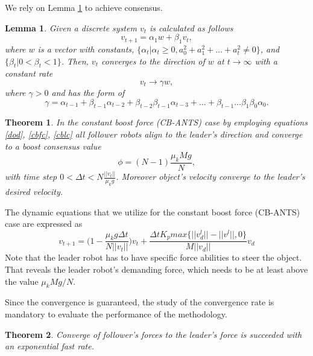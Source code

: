 \documentclass[letterpaper, 10 pt, conference]{ieeeconf}
\newtheorem{lemma}{\textbf{Lemma}}
\newtheorem{theorem}{\textbf{Theorem}}
\begin{document}
We rely on Lemma \ref{lem1} to achieve consensus. \vspace{.2cm}
\begin{lemma}\label{lem1}
\textit{Given a discrete system $v_t$ is calculated as follows
\begin{equation}
v_{t+1}=\alpha_1 w+\beta_1 v_t,
\end{equation}
where $w$ is a vector with constants, $\{ \alpha_t|\alpha_t \geq 0, a_0^2+a_1^2+\hdots +a_t^2 \neq 0 \}$, and $\{ \beta_t|0<\beta_t<1 \}$. Then, $v_t$ converges to the direction of $w$ at $t \rightarrow \infty$ with a constant rate
\begin{equation}
v_t \rightarrow \gamma w,
\end{equation}
where $\gamma >0$ and has the form of
\begin{equation}
\gamma =\alpha_{t-1} + \beta_{t-1}\alpha_{t-2}+\beta_{t-2}\beta_{t-1}\alpha_{t-3}+\hdots+\beta_{t-1}\hdots \beta_1\beta_0\alpha_0.
\end{equation}} \vspace{.2cm}
\end{lemma}
\begin{theorem}\label{thrm1}
\textit{In the constant boost force (CB-ANTS) case by employing equations \ref{dod}, \ref{cbfc}, \ref{cblc} all follower robots align to the leader's direction and converge to a boost consensus value 
\begin{equation}
\phi = (N-1)\frac{\mu_kMg}{N},
\end{equation}
with time step $0<\Delta t<N\frac{||v_t||}{\mu_kg}$. Moreover object's velocity converge to the leader's desired velocity.} \vspace{.2cm}
\end{theorem}
The dynamic equations that we utilize for the constant boost force (CB-ANTS) case are expressed as
\begin{equation}
v_{t+1}= \Bigg(1-\frac{\mu_k g \Delta t}{N||v_t||}\Bigg)v_t+ \frac{\Delta t K_pmax\{ ||v_d^l||-||v^l||,0 \}}{M ||v_d||}v_d
\end{equation}
Note that the leader robot has to have specific force abilities to steer the object. That reveals the leader robot's demanding force, which needs to be at least above the value $\mu_kMg/N$. 

Since the convergence is guaranteed, the study of the convergence rate is mandatory to evaluate the performance of the methodology.\vspace{.2cm}
\begin{theorem}\label{thrm2}
\textit{Converge of follower's forces to the leader's force is succeeded with an exponential fast rate.} \vspace{.2cm}
\end{theorem}
\end{document}
